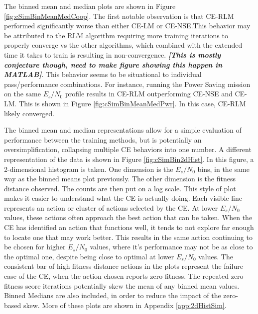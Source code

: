 \par The binned mean and median plots are shown in Figure \ref{fig:cSimBinMeanMedCoop}. The first notable observation is that CE-RLM performed significantly worse than either CE-LM or CE-NSE.This behavior may be attributed to the RLM algorithm requiring more training iterations to properly converge vs the other algorithms, which combined with the extended time it takes to train is resulting in non-convergence. \textbf{\textit{[This is mostly conjecture though, need to make figure showing this happen in MATLAB]}}. This behavior seems to be situational to individual pass/performance combinations. For instance, running the Power Saving mission on the same $E_s/N_0$ profile results in CE-RLM outperforming CE-NSE and CE-LM. This is shown in Figure \ref{fig:cSimBinMeanMedPwr}. In this case, CE-RLM likely converged.   

\par The binned mean and median representations allow for a simple evaluation of performance between the training methods, but is potentially an oversimplification, collapsing multiple CE behaviors into one number. A different representation of the data is shown in Figure \ref{fig:cSimBin2dHist}. In this figure, a 2-dimensional histogram is taken. One dimension is the $E_s/N_0$ bins, in the same way as the binned means plot previously. The other dimension is the fitness distance observed. The counts are then put on a log scale. This style of plot makes it easier to understand what the CE is actually doing. Each visible line represents an action or cluster of actions selected by the CE. At lower $E_s/N_0$ values, these actions often approach the best action that can be taken. When the CE has identified an action that functions well, it tends to not explore far enough to locate one that may work better. This results in the same action continuing to be chosen for higher $E_s/N_0$ values, where it's performance may not be as close to the optimal one, despite being close to optimal at lower $E_s/N_0$ values. The consistent bar of high fitness distance actions in the plots represent the failure case of the CE, when the action chosen reports zero fitness. The repeated zero fitness score iterations potentially skew the mean of any binned mean values. Binned Medians are also included, in order to reduce the impact of the zero-based skew. More of these plots are shown in Appendix \ref{app:2dHistSim}.

